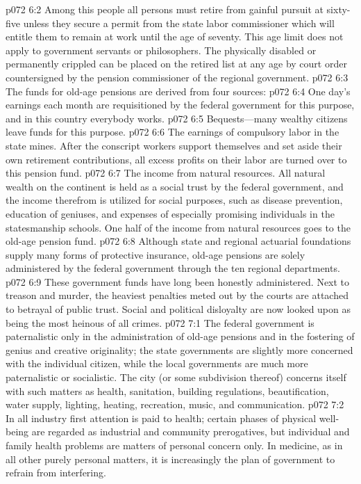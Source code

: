 \vs p072 6:2 Among this people all persons must retire from gainful pursuit at sixty\hyp{}five unless they secure a permit from the state labor commissioner which will entitle them to remain at work until the age of seventy. This age limit does not apply to government servants or philosophers. The physically disabled or permanently crippled can be placed on the retired list at any age by court order countersigned by the pension commissioner of the regional government.
\pc \vs p072 6:3 The funds for old\hyp{}age pensions are derived from four sources:
\pc \vs p072 6:4 \bibnobreakspace One day’s earnings each month are requisitioned by the federal government for this purpose, and in this country everybody works.
\vs p072 6:5 \bibnobreakspace Bequests---many wealthy citizens leave funds for this purpose.
\vs p072 6:6 \bibnobreakspace The earnings of compulsory labor in the state mines. After the conscript workers support themselves and set aside their own retirement contributions, all excess profits on their labor are turned over to this pension fund.
\vs p072 6:7 \bibnobreakspace The income from natural resources. All natural wealth on the continent is held as a social trust by the federal government, and the income therefrom is utilized for social purposes, such as disease prevention, education of geniuses, and expenses of especially promising individuals in the statesmanship schools. One half of the income from natural resources goes to the old\hyp{}age pension fund.
\pc \vs p072 6:8 Although state and regional actuarial foundations supply many forms of protective insurance, old\hyp{}age pensions are solely administered by the federal government through the ten regional departments.
\vs p072 6:9 These government funds have long been honestly administered. Next to treason and murder, the heaviest penalties meted out by the courts are attached to betrayal of public trust. Social and political disloyalty are now looked upon as being the most heinous of all crimes.
\vs p072 7:1 The federal government is paternalistic only in the administration of old\hyp{}age pensions and in the fostering of genius and creative originality; the state governments are slightly more concerned with the individual citizen, while the local governments are much more paternalistic or socialistic. The city (or some subdivision thereof) concerns itself with such matters as health, sanitation, building regulations, beautification, water supply, lighting, heating, recreation, music, and communication.
\vs p072 7:2 In all industry first attention is paid to health; certain phases of physical well\hyp{}being are regarded as industrial and community prerogatives, but individual and family health problems are matters of personal concern only. In medicine, as in all other purely personal matters, it is increasingly the plan of government to refrain from interfering.
